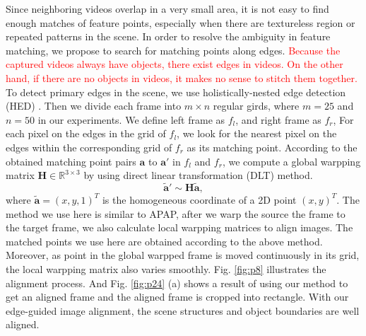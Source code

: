 \documentclass[conference]{IEEEtran}
\begin{document}
Since neighboring videos overlap in a very small area, it is not easy to find enough matches of feature points, 
especially when there are textureless region or repeated patterns in the scene. 
In order to resolve the ambiguity in feature matching, we propose to search for matching points along edges.
\textcolor{red}{Because the captured videos always have objects, there exist edges in videos. 
On the other hand, if there are no objects in videos, it makes no sense to stitch them together.}
To detect primary edges in the scene, we use holistically-nested edge detection (HED) \cite{xie2015holistically}. 
Then we divide each frame into $m \times n$ regular girds, where $m=25$ and $n=50$ in our experiments.
We define left frame as $f_l$, and right frame as $f_r$,
For each pixel on the edges in the grid of $f_l$, we look for the nearest pixel on the edges within the corresponding grid of $f_r$ as its matching point.
According to the obtained matching point pairs $\mathbf{a}$ to $\mathbf{a}'$ in $f_l$ and $f_r$, 
we compute a global warpping matrix $\mathbf{H} \in \mathbb{R}^{3 \times 3}$ by using direct linear transformation (DLT) method.
\begin{equation}
\widetilde{\textbf{a}}' \sim \mathbf{H} \widetilde{\textbf{a}},
\end{equation}
where $\widetilde{\mathbf{a}}=(x,y,1)^{T}$ is the homogeneous coordinate of a 2D point $(x,y)^{T}$.
The method we use here is similar to APAP, after we warp the source the frame to the target frame, we also calculate local warpping matrices to align images.
The matched points we use here are obtained according to the above method. 
Moreover, as point in the global warpped frame is moved continuously in its grid, the local warpping matrix also varies smoothly.
Fig. \ref{fig:p8} illustrates the alignment process. And Fig. \ref{fig:p24} (a) shows a result of using our method to get an aligned frame 
and the aligned frame is cropped into rectangle.
With our edge-guided image alignment, the scene structures and object boundaries are well aligned. 
\end{document}
